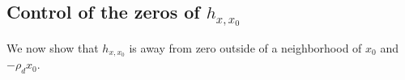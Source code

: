 \documentclass[11pt]{article}
\newcommand{\eps}{\epsilon}
\newcommand{\xo}{x_0}
\newcommand{\hxxo}{h_{x, \xo}}
\begin{document}
%
%
%
%

\subsection{Control of the zeros of $\hxxo$} \label{sec:zeros-hxxo}

We now show that $\hxxo$ is away from zero outside of a neighborhood of $\xo$ and $-\rho_d \xo$.
\end{document}
